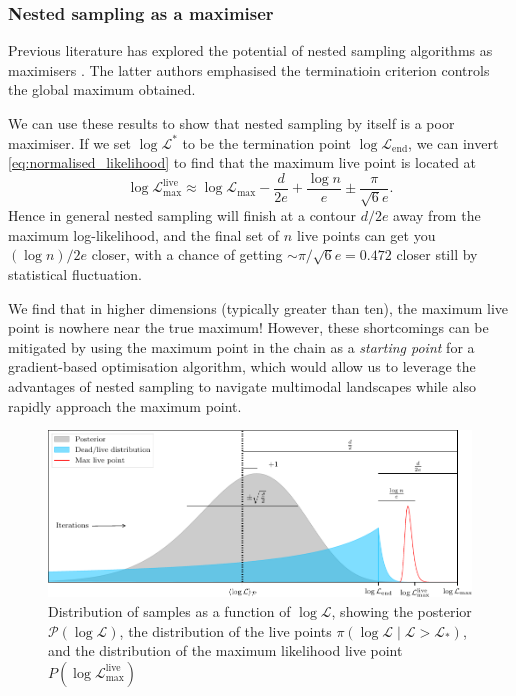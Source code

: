 \documentclass[usenatbib]{mnras}
\newcommand{\Like}{\mathcal{L}}
\begin{document}
\subsubsection*{Nested sampling as a maximiser}
Previous literature has explored the potential of nested sampling algorithms as maximisers \citep{Akrami_2010, Feroz_2011}. The latter authors emphasised the terminatioin criterion controls the global maximum obtained. 
\par
We can use these results to show that nested sampling by itself is a poor maximiser. If we set $\log\Like^{*}$ to be the termination point $\log\Like_\mathrm{end}$, we can invert \cref{eq:normalised_likelihood} to find that the maximum live point is located at
\begin{equation}
    \boxed{
        \log{\mathcal{L}}_\mathrm{max}^\mathrm{live} \approx \log\mathcal{L}_\mathrm{max} - \frac{d}{2e} + \frac{\log n}{e} \pm \frac{\pi}{\sqrt{6}e}
    }.
\end{equation}
Hence in general nested sampling will finish at a contour $d/2e$ away from the maximum log-likelihood, and the final set of $n$ live points can get you $(\log n)/2e$ closer, with a chance of getting $\sim\pi/\sqrt{6}e=0.472$ closer still by statistical fluctuation. 
\par
We find that in higher dimensions (typically greater than ten), the maximum live point is nowhere near the true maximum! However, these shortcomings can be mitigated by using the maximum point in the chain as a \textit{starting point} for a gradient-based optimisation algorithm, which would allow us to leverage the advantages of nested sampling to navigate multimodal landscapes while also rapidly approach the maximum point.
\begin{figure}
\begin{center}
	\includegraphics{figures/anatomy.pdf}
\end{center}
\caption{Distribution of samples as a function of $\log\mathcal{L}$, showing the posterior $\mathcal{P}(\log\mathcal{L})$, the distribution of the live points $\mathcal{\pi}(\log\mathcal{L} \mid \mathcal{L}>\mathcal{L}_*)$, and the distribution of the maximum likelihood live point $P(\log\mathcal{L}_\mathrm{max}^\mathrm{live})$}
\label{fig:anatomy}
\end{figure}
\end{document}
